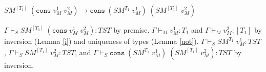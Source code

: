 \begin{case}
$SM^{[T_{1}]}\;(\mathtt{cons}\;v_{M}^{1}\;v_{M}^{2})\rightarrow\mathtt{cons}\;(SM^{T_{1}}\;v_{M}^{1})\;(SM^{[T_{1}]}\;v_{M}^{2})$

$\Gamma\vdash_{S}SM^{[T_{1}]}\;(\mathtt{cons}\;v_{M}^{1}\;v_{M}^{2}):TST$ by premise.  $\Gamma\vdash_{M}v_{M}^{1}:T_{1}$ and $\Gamma\vdash_{M}v_{M}^{2}:[T_{1}]$ by inversion (Lemma \ref{i}) and uniqueness of types (Lemma \ref{uot}).  $\Gamma\vdash_{S}SM^{T_{1}}\;v_{M}^{1}:TST$, $\Gamma\vdash_{S}SM^{[T_{1}]}\;v_{M}^{2}:TST$, and $\Gamma\vdash_{S}\mathtt{cons}\;(SM^{T_{1}}\;v_{M}^{1})\;(SM^{[T_{1}]}\;v_{M}^{2}):TST$ by inversion.
\end{case}